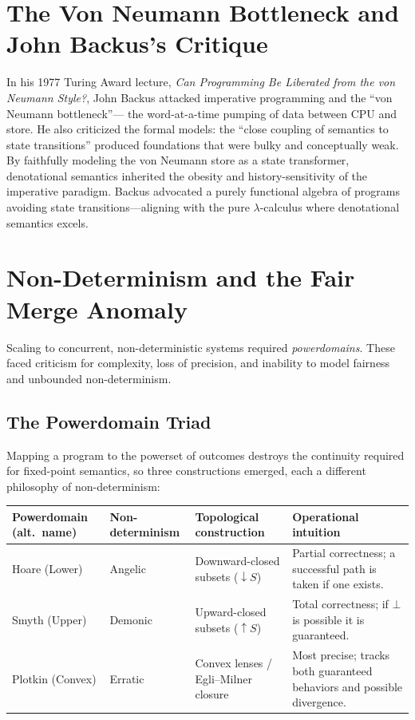 \documentclass[11pt]{article}
\begin{document}
\section{The Von Neumann Bottleneck and John Backus's Critique}

In his 1977 Turing Award lecture, \emph{Can Programming Be Liberated from the von Neumann
Style?}, John Backus attacked imperative programming and the ``von Neumann bottleneck''---
the word-at-a-time pumping of data between CPU and store. He also criticized the formal
models: the ``close coupling of semantics to state transitions'' produced foundations that
were bulky and conceptually weak. By faithfully modeling the von Neumann store as a state
transformer, denotational semantics inherited the obesity and history-sensitivity of the
imperative paradigm. Backus advocated a purely functional algebra of programs avoiding
state transitions---aligning with the pure $\lambda$-calculus where denotational semantics
excels.

\section{Non-Determinism and the Fair Merge Anomaly}

Scaling to concurrent, non-deterministic systems required \emph{powerdomains}. These faced
criticism for complexity, loss of precision, and inability to model fairness and unbounded
non-determinism.

\subsection{The Powerdomain Triad}

Mapping a program to the powerset of outcomes destroys the continuity required for
fixed-point semantics, so three constructions emerged, each a different philosophy of
non-determinism:

\begin{center}\small
\begin{tabular}{@{}p{2.1cm}p{2.0cm}p{4.8cm}p{4.0cm}@{}}
\toprule
Powerdomain (alt.\ name) & Non-determinism & Topological construction & Operational intuition \\
\midrule
Hoare (Lower) & Angelic & Downward-closed subsets ($\downarrow\! S$) & Partial correctness; a successful path is taken if one exists. \\
Smyth (Upper) & Demonic & Upward-closed subsets ($\uparrow\! S$) & Total correctness; if $\bot$ is possible it is guaranteed. \\
Plotkin (Convex) & Erratic & Convex lenses / Egli--Milner closure & Most precise; tracks both guaranteed behaviors and possible divergence. \\
\bottomrule
\end{tabular}
\end{center}
\end{document}
